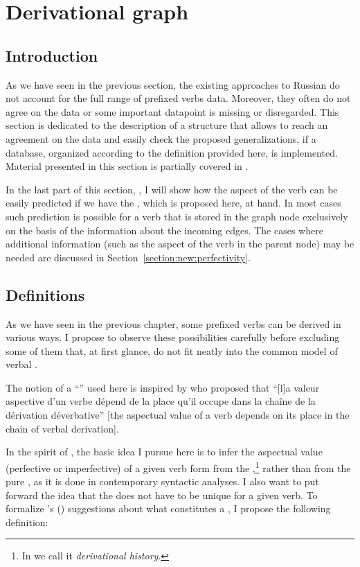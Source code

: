 
\section{Derivational graph}\label{section:graph}
\subsection{Introduction}
As we have seen in the previous section, the existing approaches to Russian  do not account for the full range of prefixed verbs data. Moreover, they often do not agree on the data or some important datapoint is missing or disregarded. This section is dedicated to the description of a structure that allows to reach an agreement on the  data and easily check the proposed generalizations, if a database, organized according to the definition provided here, is implemented. Material presented in this section is partially covered in \citet{ZinovaFilip:14b}.

In the last part of this section, , I will show how the aspect of the verb can be easily predicted if we have the , which is proposed here, at hand. In most cases such prediction is possible for a verb that is stored in the graph node exclusively on the basis of the information about the incoming edges. The cases where additional information (such as the aspect of the verb in the parent node) may be needed are discussed in Section~\ref{section:new:perfectivity}.

\subsection{Definitions}\label{section:chains:definition}
As we have seen in the previous chapter, some prefixed verbs can be derived in various ways. I propose to observe these possibilities carefully before excluding some of them that, at first glance, do not fit neatly into the common model of verbal .

The notion of a ``'' used here is inspired by \citet{Karcevski:27} who proposed that ``[l]a valeur aspective d'un verbe d\'{e}pend de la place qu'il occupe dans la cha\^{i}ne de la d\'{e}rivation d\'{e}verbative'' [the aspectual value of a verb depends on its place in the chain of verbal derivation].

In the spirit of \citet{Karcevski:27}, the basic idea I pursue here is to infer the aspectual value (perfective or imperfective) of a given verb form from the ,\footnote{In \citet{ZinovaFilip:14b} we call it \textit{derivational history}.} rather than from the pure , as it is done in contemporary syntactic analyses. I also want to put forward the idea that the  does not have to be unique for a given verb. To formalize \citeauthor{Karcevski:27}'s (\citeyear{Karcevski:27}) suggestions about what constitutes a , I propose the following definition:\largerpage

